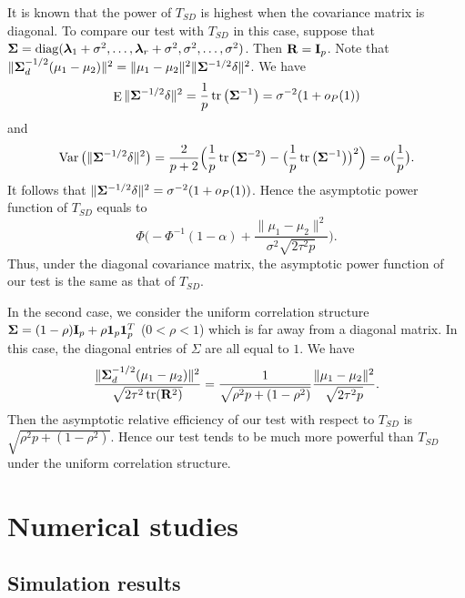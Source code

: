 \documentclass[3p]{elsarticle}
\DeclareMathOperator{\mytr}{tr}
\DeclareMathOperator{\mydiag}{diag}
\DeclareMathOperator{\myE}{E}
\DeclareMathOperator{\myVar}{Var}
\newcommand{\bfsym}[1]{\ensuremath{\boldsymbol{#1}}}
\def\blambda {\bfsym {\lambda}}        \def\bLambda {\bfsym {\Lambda}}
\theoremstyle{plain}
\theoremstyle{definition}
\theoremstyle{remark}
\begin{document}
 It is known that the power of $T_{SD}$ is highest when the covariance matrix is diagonal.
 To compare our test with $T_{SD}$ in this case,
suppose that $\bSigma=\mydiag(\blambda_1+\sigma^2,\ldots,\blambda_r+\sigma^2,\sigma^2,\ldots,\sigma^2)$. Then $\mathbf{R}=\mathbf{I}_p$.
 Note that $\|\bSigma_d^{-1/2}(\mu_1-\mu_2)\|^2=\|\mu_1-\mu_2\|^2 \|\bSigma^{-1/2}\delta\|^2$.
 We have 
 $$\myE\|\bSigma^{-1/2}\delta\|^2=
 \frac{1}{p}\mytr\big(\bSigma^{-1}\big)
 =\sigma^{-2} (1+o_P(1))
 $$
and
 $$
 \myVar\big( \|\bSigma^{-1/2}\delta\|^2 \big)=\frac{2}{p+2}\Big(\frac{1}{p}\mytr\big(\bSigma^{-2}\big)-\big(\frac{1}{p}\mytr\big(\bSigma^{-1}\big)\big)^2\Big)=o\big(\frac{1}{p}\big).$$
It follows that $\|\bSigma^{-1/2}\delta\|^2=\sigma^{-2}(1+o_P(1))$. Hence the asymptotic power function of $T_{SD}$ equals to
 $$
        \Phi\Big(-\Phi^{-1}(1-\alpha)+\frac{\|\mu_1-\mu_2\|^2}{\sigma^2\sqrt{2\tau^2 p}}\Big).
 $$
 Thus, under the diagonal covariance matrix, the asymptotic power function of our test is the same as that of $T_{SD}$.

In the second case, we consider the uniform correlation structure $\bSigma=(1-\rho)\BI_p+\rho \mathbf{1}_p\mathbf{1}_p^T$ ($0<\rho <1$) which is far away from a diagonal matrix.
 In this case, the diagonal entries of $\Sigma$ are all equal to $1$. 
 We have
 $$
 \frac{\|\bSigma_d^{-1/2}(\mu_1-\mu_2)\|^2}{\sqrt{2\tau^2\mytr(\BR^2)}}
 =
 \frac{1}{\sqrt{\rho^2 p +(1-\rho^2)}}\frac{\|\mu_1-\mu_2\|^2}{\sqrt{2\tau^2p}}.
 $$
 Then the asymptotic relative efficiency of our test with respect to $T_{SD}$ is
 $\sqrt{\rho^2 p +(1-\rho^2)}$.
 Hence our test tends to be much more powerful than $T_{SD}$ under the uniform correlation structure.






\section{Numerical studies}
\subsection{Simulation results}
\end{document}

